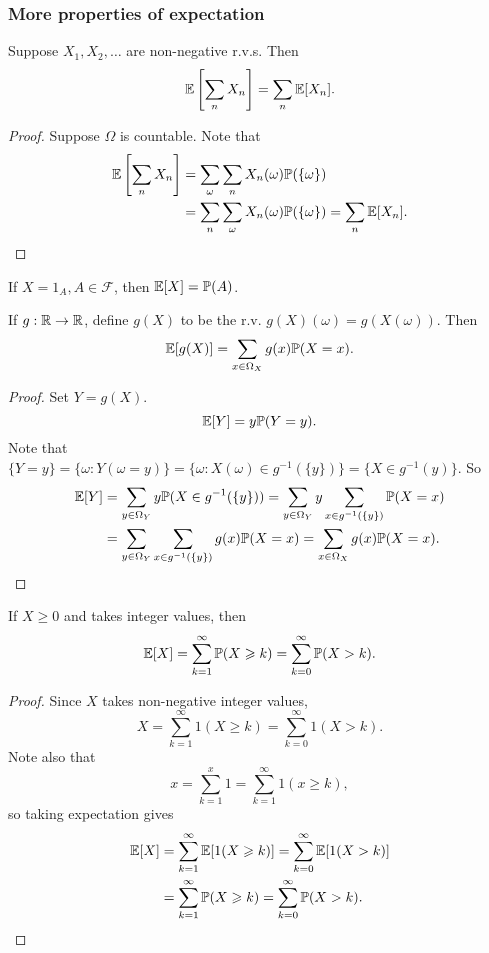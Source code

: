 \subsubsection*{More properties of expectation}
\begin{proposition}
    Suppose $ X_1,X_2,\dots $ are non-negative r.v.s. Then 
    \[
        {\mathbb{E}} \left[ \sum_n X_n \right] = \sum_n {\mathbb{E}}[X_n].
    \]
\end{proposition}
\begin{proof}
    Suppose $\Omega$ is countable. Note that 
    \begin{align*}
        {\mathbb{E}}\left[ \sum_n X_n \right] &= \sum_\omega \sum_n X_n(\omega)\mathbb{P}(\{\omega\})\\ 
        &= \sum_n\sum_\omega X_n(\omega)\mathbb{P}(\{\omega\}) = \sum_n{\mathbb{E}}[X_n].
    \end{align*}
\end{proof}

\begin{proposition}
    If $ X=1_A,A\in \mathscr{F} $, then $ {\mathbb{E}}[X]=\mathbb{P}(A) $.
\end{proposition}
\begin{proposition}
    If $g:{\mathbb{R}}\to {\mathbb{R}}$, define $ g(X) $ to be the r.v. $ g(X)(\omega)=g(X(\omega)) $. Then 
    \[
        {\mathbb{E}}[g(X)] = \sum_{x\in \Omega_X} g(x)\mathbb{P}(X=x).
    \]
\end{proposition}
\begin{proof}
    Set $Y=g(X)$. 
    \[
        {\mathbb{E}}[Y] = y \mathbb{P}(Y=y).
    \]
    Note that $ \{Y=y\} = \{\omega:Y(\omega=y)\} = \{\omega:X(\omega)\in g^{-1}(\{y\})\} = \{X\in g^{-1}(y)\} $. So 
    \begin{align*}
        {\mathbb{E}}[Y]&= \sum_{y\in \Omega_Y}y \mathbb{P}(X\in g^{-1}(\{y\}))=\sum_{y\in \Omega_Y}y \sum_{x\in g^{-1}(\{y\})}\mathbb{P}(X=x)\\
        &= \sum_{y\in \Omega_Y}\sum_{x\in g^{-1}(\{y\})}g(x)\mathbb{P}(X=x)= \sum_{x\in \Omega_X} g(x)\mathbb{P}(X=x).\qedhere
    \end{align*}
\end{proof}

\begin{proposition}
    If $ X\ge 0 $ and takes integer values, then 
    \[
        {\mathbb{E}}[X] = \sum_{k=1}^{\infty} \mathbb{P}(X\geqslant k) = \sum_{k=0}^{\infty}\mathbb{P}(X>k).
    \]
\end{proposition}
\begin{proof}
    Since $X$ takes non-negative integer values, 
    \[
        X = \sum_{k=1}^{\infty}1(X\ge k) = \sum_{k=0}^{\infty}1(X>k).
    \]
    Note also that 
    \[
        x = \sum_{k=1}^{x}1 = \sum_{k=1}^{\infty} 1(x\ge k),
    \]
    so taking expectation gives 
    \begin{align*}
        {\mathbb{E}}[X] &= \sum_{k=1}^{\infty}{\mathbb{E}}[1(X\geqslant k)] = \sum_{k=0}^{\infty}{\mathbb{E}}[1(X>k)]\\ 
        &= \sum_{k=1}^{\infty} \mathbb{P}(X\geqslant k) = \sum_{k=0}^{\infty}\mathbb{P}(X>k).\qedhere
    \end{align*}
\end{proof}

